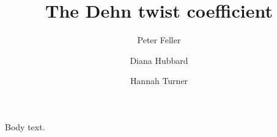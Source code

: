 \documentclass{amsart}
\begin{document}
\title{The Dehn twist coefficient}
\author{Peter Feller}
\author{Diana Hubbard}
\author{Hannah Turner}

\address{ETH Zurich, Ramistrasse 101, 8092 Zurich, Switzerland}

\address{Brooklyn College CUNY, 2900 Bedford Avenue 11210 USA}

\address{Georgia Institute of Technology}

\maketitle
Body text.
\end{document}
